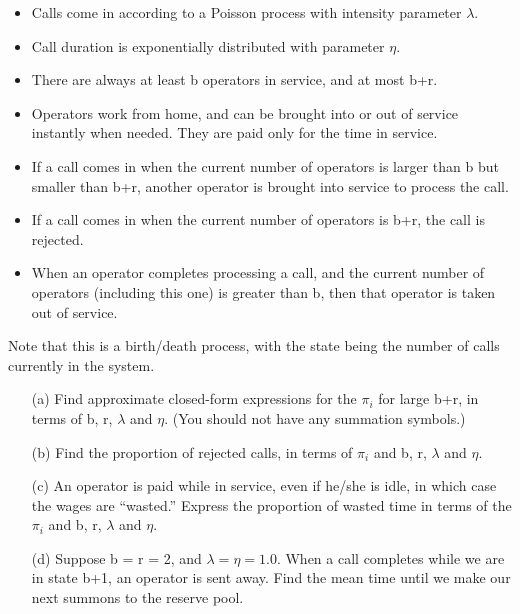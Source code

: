 \begin{itemize}

\item Calls come in according to a Poisson process with intensity
parameter $\lambda$.

\item Call duration is exponentially distributed with parameter $\eta$.

\item There are always at least b operators in service, and at most b+r.

\item Operators work from home, and can be brought into or out of
service instantly when needed.  They are paid only for the time in
service.

\item If a call comes in when the current number of operators is larger
than b but smaller than b+r, another operator is brought into
service to process the call.

\item If a call comes in when the current number of operators is b+r,
the call is rejected.

\item When an operator completes processing a call, and the current
number of operators (including this one) is greater than b, then that
operator is taken out of service.

\end{itemize}

Note that this is a birth/death process, with the state being the
number of calls currently in the system.

\begin{itemize}

\item [(a)] Find approximate closed-form expressions for the $\pi_i$ for
large b+r, in terms of b, r, $\lambda$ and $\eta$.  (You should not have
any summation symbols.)

\item [(b)] Find the proportion of rejected calls, in terms of $\pi_i$
and b, r, $\lambda$ and $\eta$.

\item [(c)] An operator is paid while in service, even if he/she is
idle, in which case the wages are ``wasted.'' Express the proportion of
wasted time in terms of the $\pi_i$ and b, r, $\lambda$ and $\eta$.       

\item [(d)] Suppose b = r = 2, and $\lambda = \eta = 1.0$. When a call
completes while we are in state b+1, an operator is sent away. Find the
mean time until we make our next summons to the reserve pool.            

\end{itemize}

